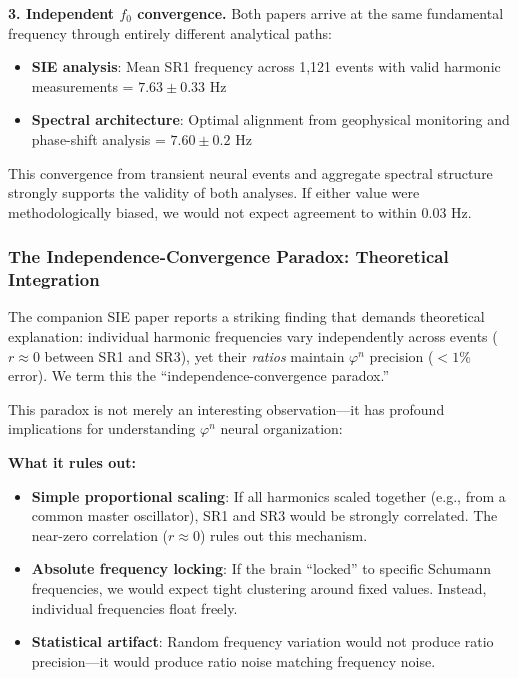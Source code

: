 \documentclass[11pt,a4paper]{article}
\newcommand{\phisym}{\varphi}
\newcommand{\fzero}{f_0}
\begin{document}
\textbf{3. Independent $\fzero$ convergence.} Both papers arrive at the same fundamental frequency through entirely different analytical paths:
\begin{itemize}
    \item \textbf{SIE analysis}: Mean SR1 frequency across 1,121 events with valid harmonic measurements = $7.63 \pm 0.33$ Hz
    \item \textbf{Spectral architecture}: Optimal alignment from geophysical monitoring and phase-shift analysis = $7.60 \pm 0.2$ Hz
\end{itemize}
This convergence from transient neural events and aggregate spectral structure strongly supports the validity of both analyses. If either value were methodologically biased, we would not expect agreement to within 0.03 Hz.

\subsubsection{The Independence-Convergence Paradox: Theoretical Integration}

The companion SIE paper reports a striking finding that demands theoretical explanation: individual harmonic frequencies vary independently across events ($r \approx 0$ between SR1 and SR3), yet their \textit{ratios} maintain $\phisym^n$ precision ($<1\%$ error). We term this the ``independence-convergence paradox.''

This paradox is not merely an interesting observation---it has profound implications for understanding $\phisym^n$ neural organization:

\textbf{What it rules out:}
\begin{itemize}
    \item \textbf{Simple proportional scaling}: If all harmonics scaled together (e.g., from a common master oscillator), SR1 and SR3 would be strongly correlated. The near-zero correlation ($r \approx 0$) rules out this mechanism.
    \item \textbf{Absolute frequency locking}: If the brain ``locked'' to specific Schumann frequencies, we would expect tight clustering around fixed values. Instead, individual frequencies float freely.
    \item \textbf{Statistical artifact}: Random frequency variation would not produce ratio precision---it would produce ratio noise matching frequency noise.
\end{itemize}
\end{document}
